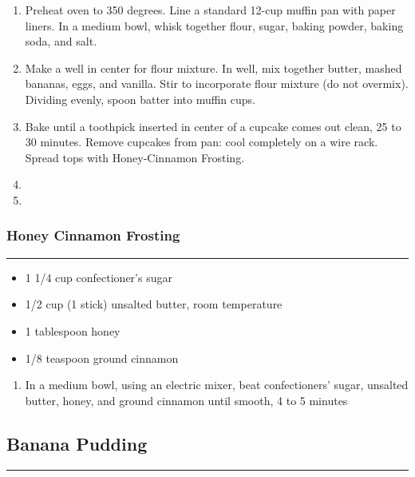 \documentclass{article}
\begin{document}
\begin{enumerate}
    \item 
        Preheat oven to 350 degrees. Line a standard 12-cup muffin pan with paper liners. In a medium bowl, whisk together flour, sugar, baking powder, baking soda, and salt.
    \item 
        Make a well in center for flour mixture. In well, mix together butter, mashed bananas, eggs, and vanilla. Stir to incorporate flour mixture (do not overmix). Dividing evenly, spoon batter into muffin cups.
    \item 
        Bake until a toothpick inserted in center of a cupcake comes out clean, 25 to 30 minutes. Remove cupcakes from pan: cool completely on a wire rack. Spread tops with Honey-Cinnamon Frosting.
    \item 
    \item 
\end{enumerate}

\subsubsection{Honey Cinnamon Frosting}
\noindent\rule[0.5ex]{\linewidth}{0.5pt}

\begin{framed}
    \begin{itemize}
        \item 1 1/4 cup confectioner's sugar 
        \item 1/2 cup (1 stick) unsalted butter, room temperature
        \item 1 tablespoon honey
        \item 1/8 teaspoon ground cinnamon
    \end{itemize}
\end{framed}

\begin{enumerate}
    \item 
        In a medium bowl, using an electric mixer, beat confectioners' sugar, unsalted butter, honey, and ground cinnamon until smooth, 4 to 5 minutes
\end{enumerate}
\newpage

\subsection{Banana Pudding} 
\noindent\rule[0.5ex]{\linewidth}{1pt}
\end{document}
